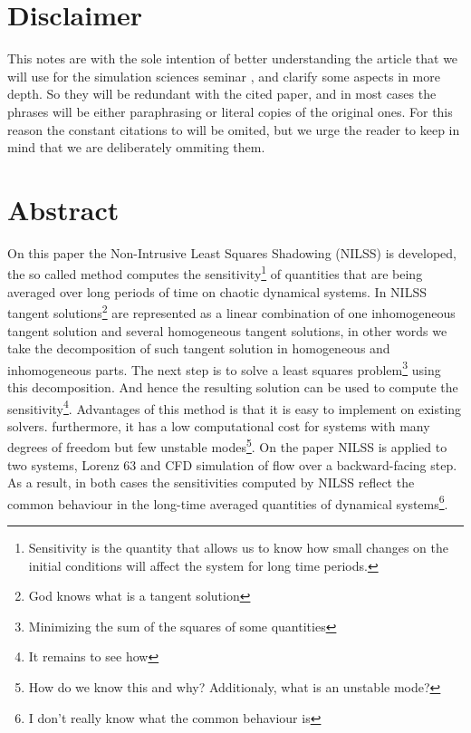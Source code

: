 \documentclass[10pt,twoside,a4paper]{article} %
\begin{document}

\tableofcontents %

\newpage %



\section*{Disclaimer}
This notes are with the sole intention of better understanding the article that we will use for the simulation sciences seminar \cite{Wang}, and clarify some aspects in more depth. So they will be redundant with the cited paper, and in most cases the phrases will be either paraphrasing or literal copies of the original ones. For this reason the constant citations to \cite{Wang} will be omited, but we urge the reader to keep in mind that we are deliberately ommiting them.
\section{Abstract}
On this paper the Non-Intrusive Least Squares Shadowing (NILSS) is developed, the so called method computes the sensitivity\footnote{Sensitivity is the quantity that allows us to know how small changes on the initial conditions will affect the system for long time periods.} of quantities that are being averaged over long periods of time on chaotic dynamical systems. In NILSS tangent solutions\footnote{God knows what is a tangent solution} are represented as a linear combination of one inhomogeneous tangent solution and several homogeneous tangent solutions, in other words we take the decomposition of such tangent solution in homogeneous and inhomogeneous parts. The next step is to solve a least squares problem\footnote{Minimizing the sum of the squares of some quantities} using this decomposition. And hence the resulting solution can be used to compute the sensitivity\footnote{It remains to see how}. Advantages of this method is that it is easy to implement on existing solvers. furthermore, it has a low computational cost for systems with many degrees of freedom but few unstable modes\footnote{How do we know this and why? Additionaly, what is an unstable mode?}. On the paper NILSS is applied to two systems, Lorenz 63 and CFD simulation of flow over a backward-facing step. As a result, in both cases the sensitivities computed by NILSS reflect the common behaviour in the long-time averaged quantities of dynamical systems\footnote{I don't really know what the common behaviour is}.
\end{document}
